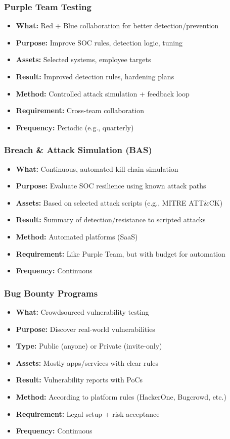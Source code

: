 \subsubsection{Purple Team Testing}
\begin{itemize}[noitemsep]
  \item \textbf{What:} Red + Blue collaboration for better detection/prevention
  \item \textbf{Purpose:} Improve SOC rules, detection logic, tuning
  \item \textbf{Assets:} Selected systems, employee targets
  \item \textbf{Result:} Improved detection rules, hardening plans
  \item \textbf{Method:} Controlled attack simulation + feedback loop
  \item \textbf{Requirement:} Cross-team collaboration
  \item \textbf{Frequency:} Periodic (e.g., quarterly)
\end{itemize}

\subsubsection{Breach \& Attack Simulation (BAS)}
\begin{itemize}[noitemsep]
  \item \textbf{What:} Continuous, automated kill chain simulation
  \item \textbf{Purpose:} Evaluate SOC resilience using known attack paths
  \item \textbf{Assets:} Based on selected attack scripts (e.g., MITRE ATT\&CK)
  \item \textbf{Result:} Summary of detection/resistance to scripted attacks
  \item \textbf{Method:} Automated platforms (SaaS)
  \item \textbf{Requirement:} Like Purple Team, but with budget for automation
  \item \textbf{Frequency:} Continuous
\end{itemize}

\subsubsection{Bug Bounty Programs}
\begin{itemize}[noitemsep]
  \item \textbf{What:} Crowdsourced vulnerability testing
  \item \textbf{Purpose:} Discover real-world vulnerabilities
  \item \textbf{Type:} Public (anyone) or Private (invite-only)
  \item \textbf{Assets:} Mostly apps/services with clear rules
  \item \textbf{Result:} Vulnerability reports with PoCs
  \item \textbf{Method:} According to platform rules (HackerOne, Bugcrowd, etc.)
  \item \textbf{Requirement:} Legal setup + risk acceptance
  \item \textbf{Frequency:} Continuous
\end{itemize}

